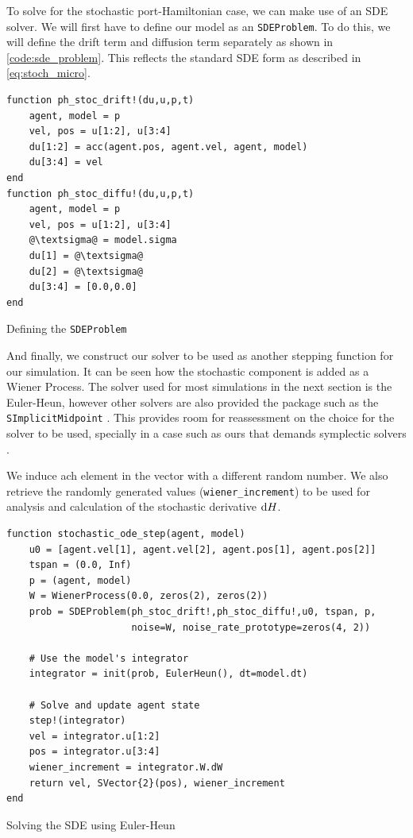 To solve for the stochastic port-Hamiltonian case, we can make use of an SDE solver. We will first have to define our model as an \texttt{SDEProblem}. To do this, we will define the drift term and diffusion term separately as shown in \autoref{code:sde_problem}. This reflects the standard SDE form as described in \autoref{eq:stoch_micro}.

\begin{listing}[H]
    \begin{verbatim}        
function ph_stoc_drift!(du,u,p,t)
    agent, model = p
    vel, pos = u[1:2], u[3:4]
    du[1:2] = acc(agent.pos, agent.vel, agent, model)
    du[3:4] = vel
end
function ph_stoc_diffu!(du,u,p,t)
    agent, model = p
    vel, pos = u[1:2], u[3:4]
    @\textsigma@ = model.sigma
    du[1] = @\textsigma@
    du[2] = @\textsigma@
    du[3:4] = [0.0,0.0]
end
\end{verbatim}
\caption{Defining the \texttt{SDEProblem}}
\label{code:sde_problem}
\end{listing}

And finally, we construct our solver to be used as another stepping function for our simulation. It can be seen how the stochastic component is added as a Wiener Process. The solver used for most simulations in the next section is the Euler-Heun, however other solvers are also provided the package such as the \texttt{SImplicitMidpoint} \cite{rackauckas2017differentialequations}. This provides room for reassessment on the choice for the solver to be used, specially in a case such as ours that demands symplectic solvers \cite{hong2022symplectic}. 

We induce ach element in the vector with a different random number. We also retrieve the randomly generated values (\texttt{wiener\_increment}) to be used for analysis and calculation of the stochastic derivative $\mathrm d H$.
\begin{listing}[H]
    \begin{verbatim}        
function stochastic_ode_step(agent, model)
    u0 = [agent.vel[1], agent.vel[2], agent.pos[1], agent.pos[2]]
    tspan = (0.0, Inf)
    p = (agent, model)
    W = WienerProcess(0.0, zeros(2), zeros(2))
    prob = SDEProblem(ph_stoc_drift!,ph_stoc_diffu!,u0, tspan, p, 
                      noise=W, noise_rate_prototype=zeros(4, 2))
    
    # Use the model's integrator
    integrator = init(prob, EulerHeun(), dt=model.dt)
    
    # Solve and update agent state
    step!(integrator)
    vel = integrator.u[1:2]
    pos = integrator.u[3:4]
    wiener_increment = integrator.W.dW
    return vel, SVector{2}(pos), wiener_increment
end
\end{verbatim}
\caption{Solving the SDE using Euler-Heun}
\label{code:sde_solve}
\end{listing}

